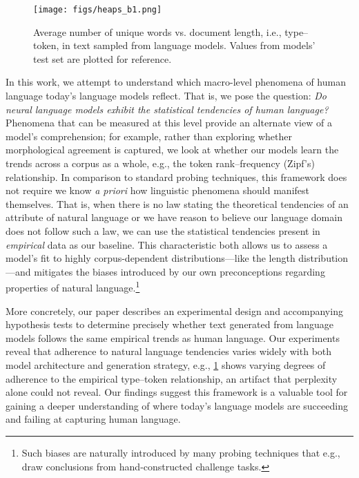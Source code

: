\documentclass[11pt,a4paper]{article}
\begin{document}
\begin{figure}
\centering
    \texttt{[image: figs/heaps\_b1.png]}
  \setlength{\belowcaptionskip}{-10pt}
    \caption{Average number of unique words vs. document length, i.e., type--token, in text sampled from language models. Values from models' test set are plotted for reference.  }\label{fig:heapslaw}
\end{figure}

In this work, we attempt to understand which macro-level phenomena of human language today's language models reflect. That is, we pose the question:
\emph{Do neural language models exhibit the statistical tendencies of human language?}
Phenomena that can be measured at this level provide an alternate view of a model's comprehension; for example,
rather than exploring whether morphological agreement is captured, we look at whether our models learn the trends across a corpus as a whole, e.g., the token rank--frequency (Zipf's) relationship. In comparison to standard probing techniques, this framework does not require we know \textit{a priori} how linguistic phenomena should manifest themselves. That is, when there is no law stating the theoretical tendencies of an attribute of natural language or we have reason to believe our language domain does not follow such a law, we can use the statistical tendencies present in \emph{empirical} data as our baseline. This characteristic both allows us to assess a model's fit to highly corpus-dependent distributions---like the length distribution---and mitigates the biases introduced by our own preconceptions regarding properties of natural language.\footnote{Such biases are naturally introduced by many probing techniques that e.g., draw conclusions from hand-constructed challenge tasks.}


More concretely, our paper describes an experimental design and accompanying hypothesis tests to determine precisely whether text generated from language models follows the same empirical trends as human language. 
Our experiments reveal that adherence to natural language tendencies varies widely with both model architecture and generation strategy, e.g., \cref{fig:heapslaw} shows varying degrees of adherence to the empirical type--token relationship, an artifact that perplexity alone could not reveal. Our findings suggest this framework is a valuable tool for gaining a deeper understanding of where today's language models are succeeding and failing at capturing human language.
\end{document}
